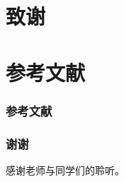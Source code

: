 \documentclass[AutoFakeBold,AutoFakeSlant]{beamer}
\begin{document}
\section*{致谢}
\section*{参考文献}
\begin{frame}[allowframebreaks]
  \frametitle{参考文献}
  
\end{frame}

\begin{frame}
  \frametitle{谢谢}
  感谢老师与同学们的聆听。
\end{frame}
\end{document}

